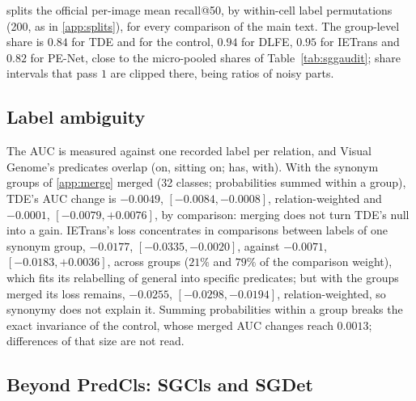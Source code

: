  splits the official per-image mean recall@50, by within-cell label
permutations (200, as in \cref{app:splits}), for every comparison of the main text. The
group-level share is $0.84$ for TDE and for the control, $0.94$ for DLFE, $0.95$ for IETrans and
$0.82$ for PE-Net, close to the micro-pooled shares of Table~\ref{tab:sggaudit}; share intervals
that pass $1$ are clipped there, being ratios of noisy parts.

\begin{table}[h]
\centering
\scriptsize
\caption{\textbf{Official per-image mean recall@50 split} (graph constraint; case-level
intervals by an image jackknife; group share with its jackknife interval, clipped at $1$).}
\label{tab:officialall}

\end{table}

\subsection{Label ambiguity}\label{app:ambiguity}

The AUC is measured against one recorded label per relation, and Visual Genome's predicates
overlap (\textsf{on}, \textsf{sitting on}; \textsf{has}, \textsf{with}). With the synonym groups
of \cref{app:merge} merged (32 classes; probabilities summed within a group), TDE's AUC change is
$-0.0049$, $[-0.0084,-0.0008]$, relation-weighted and $-0.0001$, $[-0.0079,+0.0076]$, by
comparison: merging does not turn TDE's null into a gain. IETrans's loss concentrates in
comparisons between labels of one synonym group, $-0.0177$, $[-0.0335,-0.0020]$, against
$-0.0071$, $[-0.0183,+0.0036]$, across groups ($21\%$ and $79\%$ of the comparison weight), which
fits its relabelling of general into specific predicates; but with the groups merged its loss
remains, $-0.0255$, $[-0.0298,-0.0194]$, relation-weighted, so synonymy does not explain it.
Summing probabilities within a group breaks the exact invariance of the control, whose merged
AUC changes reach $0.0013$; differences of that size are not read.

\subsection{Beyond PredCls: SGCls and SGDet}\label{app:det}

